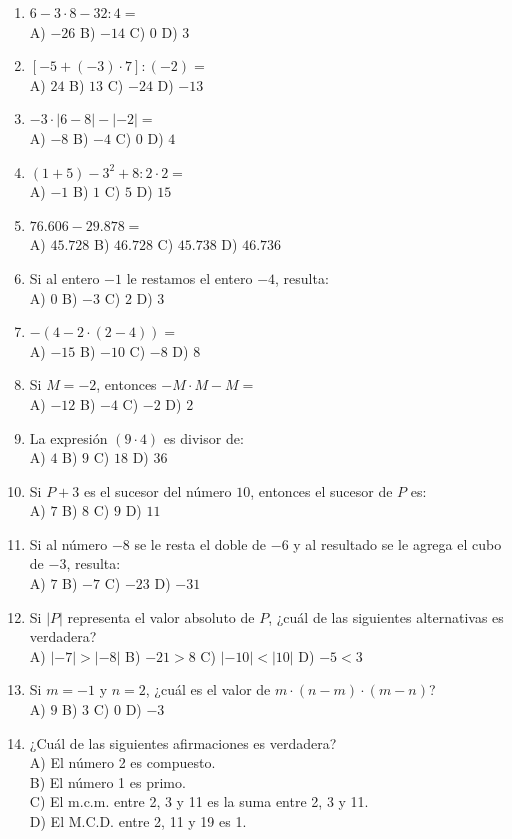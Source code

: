 \documentclass[11pt,letterpaper]{article}
\begin{document}
\begin{enumerate}[label=\textbf{\arabic*.}, leftmargin=*, itemsep=7pt]
\item $6-3\cdot 8-32:4=$\\ A) $-26$ \quad B) $-14$ \quad C) $0$ \quad D) $3$
\item $[-5+(-3)\cdot 7]:(-2)=$\\ A) $24$ \quad B) $13$ \quad C) $-24$ \quad D) $-13$
\item $-3\cdot|6-8|-|-2|=$\\ A) $-8$ \quad B) $-4$ \quad C) $0$ \quad D) $4$
\item $(1+5)-3^{2}+8:2\cdot 2=$\\ A) $-1$ \quad B) $1$ \quad C) $5$ \quad D) $15$
\item $76.606-29.878=$\\ A) $45.728$ \quad B) $46.728$ \quad C) $45.738$ \quad D) $46.736$
\item Si al entero $-1$ le restamos el entero $-4$, resulta: \\ A) $0$ \quad B) $-3$ \quad C) $2$ \quad D) $3$
\item $-(4-2\cdot(2-4))=$\\ A) $-15$ \quad B) $-10$ \quad C) $-8$ \quad D) $8$
\item Si $M=-2$, entonces $-M\cdot M-M=$\\ A) $-12$ \quad B) $-4$ \quad C) $-2$ \quad D) $2$
\item La expresión $(9\cdot 4)$ es divisor de: \\ A) $4$ \quad B) $9$ \quad C) $18$ \quad D) $36$
\item Si $P+3$ es el sucesor del número $10$, entonces el sucesor de $P$ es: \\ A) $7$ \quad B) $8$ \quad C) $9$ \quad D) $11$
\item Si al número $-8$ se le resta el doble de $-6$ y al resultado se le agrega el cubo de $-3$, resulta: \\ A) $7$ \quad B) $-7$ \quad C) $-23$ \quad D) $-31$
\item Si $|P|$ representa el valor absoluto de $P$, ¿cuál de las siguientes alternativas es verdadera?\\ A) $|-7|>|-8|$ \quad B) $-21>8$ \quad C) $|-10|<|10|$ \quad D) $-5<3$
\item Si $m=-1$ y $n=2$, ¿cuál es el valor de $m\cdot(n-m)\cdot(m-n)$?\\ A) $9$ \quad B) $3$ \quad C) $0$ \quad D) $-3$
\item ¿Cuál de las siguientes afirmaciones es verdadera?\\ A) El número 2 es compuesto.\\ B) El número 1 es primo.\\ C) El m.c.m. entre 2, 3 y 11 es la suma entre 2, 3 y 11.\\ D) El M.C.D. entre 2, 11 y 19 es 1.

\end{enumerate}
\end{document}
